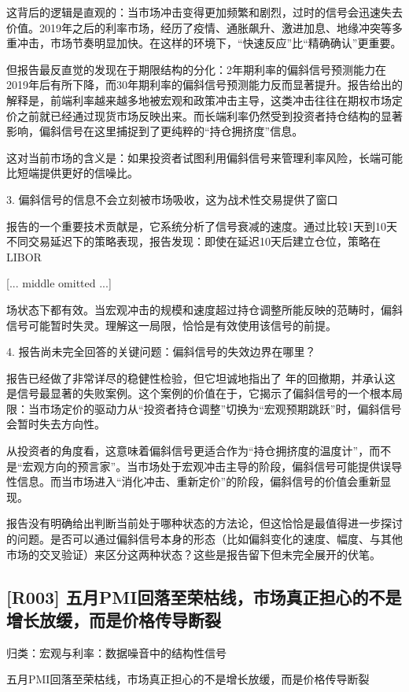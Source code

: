 \documentclass[11pt]{ctexart}
\begin{document}
这背后的逻辑是直观的：当市场冲击变得更加频繁和剧烈，过时的信号会迅速失去价值。2019年之后的利率市场，经历了疫情、通胀飙升、激进加息、地缘冲突等多重冲击，市场节奏明显加快。在这样的环境下，“快速反应”比“精确确认”更重要。

但报告最反直觉的发现在于期限结构的分化：2年期利率的偏斜信号预测能力在2019年后有所下降，而30年期利率的偏斜信号预测能力反而显著提升。报告给出的解释是，前端利率越来越多地被宏观和政策冲击主导，这类冲击往往在期权市场定价之前就已经通过现货市场反映出来。而长端利率仍然受到投资者持仓结构的显著影响，偏斜信号在这里捕捉到了更纯粹的“持仓拥挤度”信息。

这对当前市场的含义是：如果投资者试图利用偏斜信号来管理利率风险，长端可能比短端提供更好的信噪比。

3. 偏斜信号的信息不会立刻被市场吸收，这为战术性交易提供了窗口

报告的一个重要技术贡献是，它系统分析了信号衰减的速度。通过比较1天到10天不同交易延迟下的策略表现，报告发现：即使在延迟10天后建立仓位，策略在LIBOR

[... middle omitted ...]

场状态下都有效。当宏观冲击的规模和速度超过持仓调整所能反映的范畴时，偏斜信号可能暂时失灵。理解这一局限，恰恰是有效使用该信号的前提。

4. 报告尚未完全回答的关键问题：偏斜信号的失效边界在哪里？

报告已经做了非常详尽的稳健性检验，但它坦诚地指出了 年的回撤期，并承认这是信号最显著的失败案例。这个案例的价值在于，它揭示了偏斜信号的一个根本局限：当市场定价的驱动力从“投资者持仓调整”切换为“宏观预期跳跃”时，偏斜信号会暂时失去方向性。

从投资者的角度看，这意味着偏斜信号更适合作为“持仓拥挤度的温度计”，而不是“宏观方向的预言家”。当市场处于宏观冲击主导的阶段，偏斜信号可能提供误导性信息。而当市场进入“消化冲击、重新定价”的阶段，偏斜信号的价值会重新显现。

报告没有明确给出判断当前处于哪种状态的方法论，但这恰恰是最值得进一步探讨的问题。是否可以通过偏斜信号本身的形态（比如偏斜变化的速度、幅度、与其他市场的交叉验证）来区分这两种状态？这些是报告留下但未完全展开的伏笔。

\subsection{[R003] 五月PMI回落至荣枯线，市场真正担心的不是增长放缓，而是价格传导断裂}
{\small\color{refgray}归类：宏观与利率：数据噪音中的结构性信号}

五月PMI回落至荣枯线，市场真正担心的不是增长放缓，而是价格传导断裂
\end{document}
